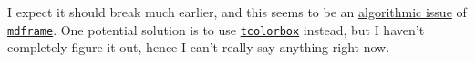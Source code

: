 I expect it should break much earlier, and this seems to be an \href{https://github.com/marcodaniel/mdframed/issues/9}{algorithmic issue} of \href{https://ctan.org/pkg/mdframed?lang=en}{\texttt{mdframe}}. One potential solution is to use \href{https://ctan.org/pkg/tcolorbox?lang=en}{\texttt{tcolorbox}} instead, but I haven't completely figure it out, hence I can't really say anything right now.